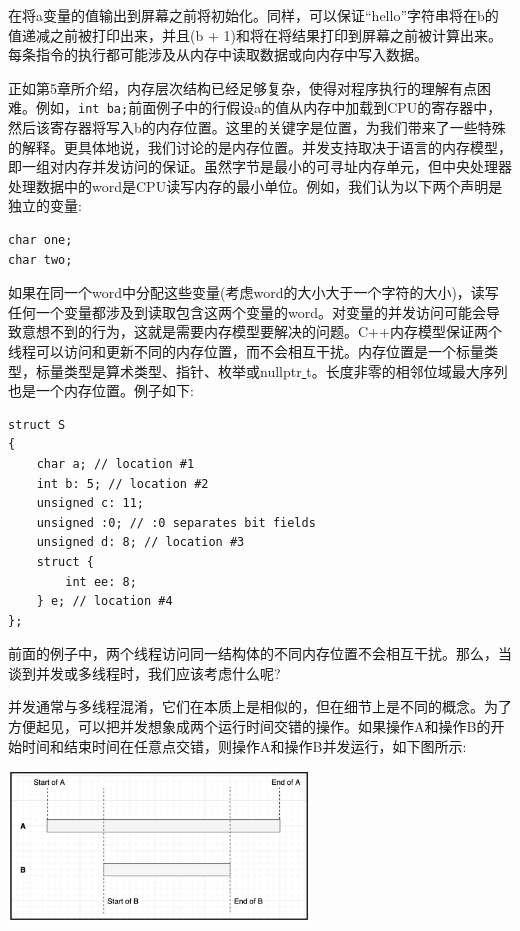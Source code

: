 在将a变量的值输出到屏幕之前将初始化。同样，可以保证“hello”字符串将在b的值递减之前被打印出来，并且(b + 1)和将在将结果打印到屏幕之前被计算出来。每条指令的执行都可能涉及从内存中读取数据或向内存中写入数据。 \par
正如第5章所介绍，内存层次结构已经足够复杂，使得对程序执行的理解有点困难。例如，\texttt{int b{a};}前面例子中的行假设a的值从内存中加载到CPU的寄存器中，然后该寄存器将写入b的内存位置。这里的关键字是位置，为我们带来了一些特殊的解释。更具体地说，我们讨论的是内存位置。并发支持取决于语言的内存模型，即一组对内存并发访问的保证。虽然字节是最小的可寻址内存单元，但中央处理器处理数据中的word是CPU读写内存的最小单位。例如，我们认为以下两个声明是独立的变量: \par

\begin{lstlisting}[caption={}]
char one;
char two;
\end{lstlisting}

如果在同一个word中分配这些变量(考虑word的大小大于一个字符的大小)，读写任何一个变量都涉及到读取包含这两个变量的word。对变量的并发访问可能会导致意想不到的行为，这就是需要内存模型要解决的问题。C++内存模型保证两个线程可以访问和更新不同的内存位置，而不会相互干扰。内存位置是一个标量类型，标量类型是算术类型、指针、枚举或nullptr\underline{ }t。长度非零的相邻位域最大序列也是一个内存位置。例子如下: \par

\begin{lstlisting}[caption={}]
struct S
{
	char a; // location #1
	int b: 5; // location #2
	unsigned c: 11;
	unsigned :0; // :0 separates bit fields
	unsigned d: 8; // location #3
	struct {
		int ee: 8;
	} e; // location #4
};
\end{lstlisting}

前面的例子中，两个线程访问同一结构体的不同内存位置不会相互干扰。那么，当谈到并发或多线程时，我们应该考虑什么呢? \par
并发通常与多线程混淆，它们在本质上是相似的，但在细节上是不同的概念。为了方便起见，可以把并发想象成两个运行时间交错的操作。如果操作A和操作B的开始时间和结束时间在任意点交错，则操作A和操作B并发运行，如下图所示: \par

\begin{center}
	\includegraphics[width=0.6\textwidth]{content/Section-2/Chapter-8/1}
\end{center}

